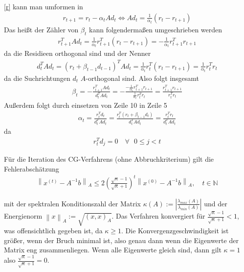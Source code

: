 \documentclass[12pt,a4paper]{scrartcl}
\numberwithin{equation}{section}
\numberwithin{myalgctr}{section}
\numberwithin{mytheoremctr}{subsection}
\numberwithin{mykorollarctr}{subsection}
\numberwithin{mylemmactr}{subsection}
\numberwithin{mybeispielctr}{subsection}
\newcommand\norm[1]{\left\lVert#1\right\rVert}
\begin{document}
	\cref{r} kann man umformen in 
	\begin{align*}
		r_{t+1} =  r_t - \alpha_tAd_t \Leftrightarrow Ad_t = \frac{1}{\alpha_t}(r_t - r_{t+1})
	\end{align*}
	Das heißt der Zähler von $\beta_t$ kann folgendermaßen umgeschrieben werden
	\begin{align*}
		r_{t+1}^{T}Ad_t = \frac{1}{\alpha_t}r_{t+1}^{T}(r_t - r_{t+1}) = -\frac{1}{\alpha_t}r_{t+1}^{T}r_{t+1}
	\end{align*}
	da die Residieen orthogonal sind und der Nenner
	\begin{align*}
		d_t^{T}Ad_t = (r_t + \beta_{t-1}d_{t-1})^{T}Ad_t =  \frac{1}{\alpha_t}r_{t}^{T}(r_t - r_{t+1}) = \frac{1}{\alpha_t}r_t^{T}r_t 
	\end{align*}
	da die Suchrichtungen $d_t$ $A$-orthogonal sind.
	Also folgt insgesamt
	\begin{align*}
		\beta_t = -\frac{r_{t+1}^{T}Ad_t}{d_t^{T}Ad_t} = -\frac{-\frac{1}{\alpha_t}r_{t+1}^{T}r_{t+1}}{\frac{1}{\alpha_t}r_t^{T}r_t } = \frac{r_{t+1}^{T}r_{t+1}}{r_t^{T}r_t }
	\end{align*}
	Außerdem folgt durch einsetzen von Zeile 10 in Zeile 5
	\begin{align*}
		\alpha_t = \frac{r_t^{T}d_t}{d_t^{T}Ad_t} = \frac{r_t^{T}(r_t + \beta_{t-1}d_t)}{d_t^{T}Ad_t} = \frac{r_t^{T}r_t}{d_t^{T}Ad_t}
	\end{align*}
	da \autocite[vgl.][100]{skript}
	\begin{align*}
		r_t^{T}d_j = 0 \quad \forall \text{ }0 \leq j < t
	\end{align*}
	
	
	
	
	Für die Iteration des CG-Verfahrens (ohne Abbruchkriterium) gilt die Fehlerabschätzung \autocite[vgl.][102]{skript}
	\begin{align*}
		\norm{x^{(t)} - A^{-1}b}_A \leq 2\left(\frac{\sqrt{\kappa} - 1}{\sqrt{\kappa} + 1}\right)^{t}\norm{x^{(0)} - A^{-1}b}_A, \quad t\in\mathbb{N}
	\end{align*}
	
	mit der spektralen Konditionszahl der Matrix $\kappa(A) := \left|\frac{\lambda_{max}(A)}{\lambda_{min}(A)}\right|$ und der Energienorm $\norm{x}_A := \sqrt{(x,x)_A}$. Das Verfahren konvergiert für $\frac{\sqrt{\kappa} - 1}{\sqrt{\kappa} + 1} < 1$, was offensichtlich gegeben ist, da $\kappa \geq 1$. Die Konvergenzgeschwindigkeit ist größer, wenn der Bruch minimal ist, also genau dann wenn die Eigenwerte der Matrix eng zusammenliegen. Wenn alle Eigenwerte gleich sind, dann gilt $\kappa = 1$ also $\frac{\sqrt{\kappa} - 1}{\sqrt{\kappa} + 1} = 0$. 
	
	
\end{document}
